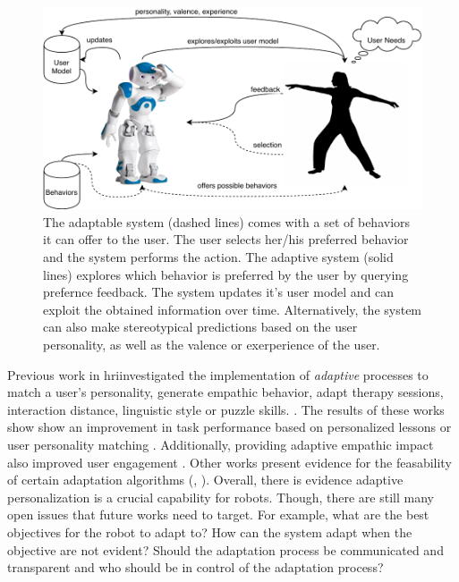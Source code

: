 \documentclass[twocolumn]{svjour3}          %
\begin{document}
\begin{figure}[h!]
\includegraphics[width=\columnwidth]{figures/figure-latex/adaptation.pdf}
\caption{The adaptable system (dashed lines) comes with a set of behaviors it can offer to the user. The user selects her/his preferred behavior and the system performs the action. The adaptive system (solid lines) explores which behavior is preferred by the user by querying prefernce feedback. The system updates it's user model and can exploit the obtained information over time. Alternatively, the system can also make stereotypical predictions based on the user personality, as well as the valence or exerperience of the user. } \label{fig:adaptation}
\end{figure}

Previous work in \gls{hri}investigated the implementation of \textit{adaptive}
processes to match a user's personality, generate empathic behavior,
adapt therapy sessions, interaction distance, linguistic style or puzzle skills.
\autocites{tapus2008user,leite2011modelling,Tsiakas2016,mitsunaga2008adapting,ritschel,leyzberg2014personalizing,hemminghaus2017towards}.
The results of these works show show an improvement in task performance based on personalized lessons or user personality matching \cite{tapus2008user, leyzberg2014personalizing,hemminghaus2017towards}. Additionally, providing adaptive empathic impact also improved user engagement \cite{leite2011modelling}. Other works present evidence for the feasability of certain adaptation algorithms (\eg{}, \cite{mitsunaga2008adapting}). Overall, there is evidence adaptive personalization is a crucial capability for robots. Though, there are still many open issues that future works need to target. For example, what are the best objectives for the robot to adapt to? How can the system adapt when the objective are not evident? Should the adaptation process be communicated and transparent and who should be in control of the adaptation process?
\end{document}

